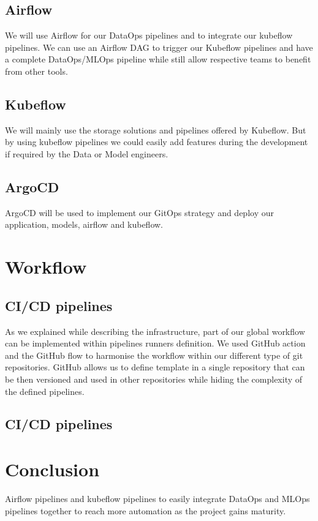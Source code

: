 \subsection{Airflow}\label{subsec:airflow}
We will use Airflow for our DataOps pipelines and to integrate our kubeflow pipelines.
We can use an Airflow DAG to trigger our Kubeflow pipelines and have a complete DataOps/MLOps pipeline while still allow respective teams
to benefit from other tools.

\subsection{Kubeflow}\label{subsec:kubeflow}
We will mainly use the storage solutions and pipelines offered by Kubeflow.
But by using kubeflow pipelines we could easily add features during the development if required by the Data or Model engineers.

\subsection{ArgoCD}\label{subsec:argocd}
ArgoCD will be used to implement our GitOps strategy and deploy our application, models, airflow and kubeflow.




\section{Workflow}\label{sec:workflow}

\subsection{CI/CD pipelines}
As we explained while describing the infrastructure, part of our global workflow can be implemented within pipelines runners definition.
We used GitHub action and the GitHub flow to harmonise the workflow within our different type of git repositories.
GitHub allows us to define template in a single repository that can be then versioned and used in other repositories while hiding the complexity of the defined pipelines.
\subsection{CI/CD pipelines}


\section{Conclusion}\label{sec:conclusion}
Airflow pipelines and kubeflow pipelines to easily integrate DataOps and MLOps pipelines together to reach more automation as the project gains maturity.
